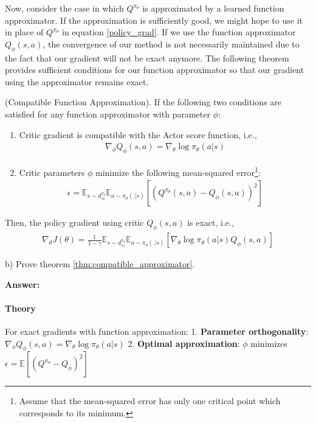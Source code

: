 Now, consider the case in which $Q^{\pi_\theta}$ is approximated by a learned function approximator. If the approximation is sufficiently good, we might hope to use it in place of $Q^{\pi_\theta}$ in equation \ref{policy_grad}. If we use the function approximator $Q_{\phi}(s, a)$, the convergence of our method is not necessarily maintained due to the fact that our gradient will not be exact anymore. The following theorem provides sufficient conditions for our function approximator so that our gradient using the approximator remains exact.

\begin{theorem}\label{thm:compatible_approximator}
    (Compatible Function Approximation). If the following two conditions are satisfied for any function approximator with parameter $\phi$:
    \begin{enumerate}
        \item Critic gradient is compatible with the Actor score function, i.e., 
        \begin{align*}
            \nabla_{\phi} Q_\phi(s, a) = \nabla_\theta \log \pi_\theta (a|s)
        \end{align*}
        \item Critic parameters $\phi$ minimize the following mean-squared error\footnote{Assume that the mean-squared error has only one critical point which corresponds to its minimum.}: 
        \begin{align*}
            \epsilon = \mathbb{E}_{s \sim d^{\pi_\theta}_{s_0}}\mathbb{E}_{a \sim \pi_\theta(.|s)} [(Q^{\pi_\theta} (s, a) - Q_\phi(s, a))^2]
        \end{align*}
    \end{enumerate}
    Then, the policy gradient using critic $Q_\phi(s, a)$ is exact, i.e., 
    \begin{align*}
            \nabla_\theta J(\theta) = \frac{1}{1-\gamma}\mathbb{E}_{s \sim d^{\pi_\theta}_{s_0}}\mathbb{E}_{a \sim \pi_\theta(.|s)} [\nabla_\theta \log \pi_\theta (a|s) Q_\phi (s, a)]
    \end{align*}
\end{theorem}

b) Prove theorem \ref{thm:compatible_approximator}.


\textbf{Answer:}

\paragraph{Theory} For exact gradients with function approximation:
1. \textbf{Parameter orthogonality}: \(\nabla_\phi Q_\phi(s,a) = \nabla_\theta \log \pi_\theta(a|s)\)
2. \textbf{Optimal approximation}: \(\phi\) minimizes \(\epsilon = \mathbb{E}[(Q^{\pi_\theta} - Q_\phi)^2]\)

